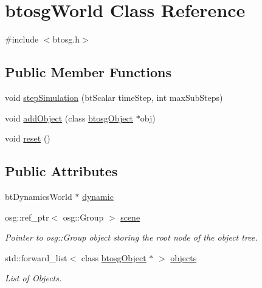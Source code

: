 \hypertarget{classbtosgWorld}{}\section{btosg\+World Class Reference}
\label{classbtosgWorld}


{\ttfamily \#include $<$btosg.\+h$>$}

\subsection*{Public Member Functions}
\begin{DoxyCompactItemize}
\item 
void \hyperlink{classbtosgWorld_afce096686d8f84afd8b8fa3f2dc161b8}{step\+Simulation} (bt\+Scalar time\+Step, int max\+Sub\+Steps)
\item 
void \hyperlink{classbtosgWorld_ae5b71c6319dd420479096a265a1725b7}{add\+Object} (class \hyperlink{classbtosgObject}{btosg\+Object} $\ast$obj)
\item 
void \hyperlink{classbtosgWorld_a6af4d066410a86b44fff5563667ea9a9}{reset} ()
\end{DoxyCompactItemize}
\subsection*{Public Attributes}
\begin{DoxyCompactItemize}
\item 
bt\+Dynamics\+World $\ast$ \hyperlink{classbtosgWorld_ad757a7b3b845142f200d1f2127e5372e}{dynamic}
\item 
\mbox{\label{classbtosgWorld_ab6d438f54ccfc18955ea43e87731e008}} 
osg\+::ref\+\_\+ptr$<$ osg\+::\+Group $>$ \hyperlink{classbtosgWorld_ab6d438f54ccfc18955ea43e87731e008}{scene}
\begin{DoxyCompactList}\small\item\em Pointer to osg\+::\+Group object storing the root node of the object tree. \end{DoxyCompactList}\item 
\mbox{\label{classbtosgWorld_ab105aa8c0f8bdbdf323d47b902f6aca0}} 
std\+::forward\+\_\+list$<$ class \hyperlink{classbtosgObject}{btosg\+Object} $\ast$ $>$ \hyperlink{classbtosgWorld_ab105aa8c0f8bdbdf323d47b902f6aca0}{objects}
\begin{DoxyCompactList}\small\item\em List of Objects. \end{DoxyCompactList}\end{DoxyCompactItemize}


